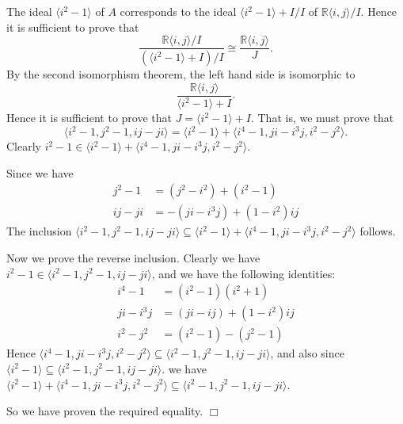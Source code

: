 \documentclass[10pt]{article}
\newenvironment{proof}[1][Proof]{\begin{trivlist}
\item[\hskip \labelsep {\bfseries #1}]}{\end{trivlist}}
\newcommand{\isom}{\cong}
\begin{document}
\begin{proof}
    The ideal $\langle i^2-1\rangle$ of $A$
    corresponds to the ideal $\langle i^2-1\rangle+I/I$
    of $\mathbb{R}\langle i,j\rangle/I$. Hence it is sufficient to prove that
    \begin{equation*}
        \frac{\mathbb{R}\langle i,j\rangle/I}{(\langle i^2-1\rangle+I)/I}\isom \frac{\mathbb{R}\langle i,j\rangle}{J}.
    \end{equation*}
    By the second isomorphism theorem, the left hand side is isomorphic to
    \begin{equation*}
        \frac{\mathbb{R}\langle i,j\rangle}{\langle i^2-1\rangle+I}.
    \end{equation*}
    Hence it is sufficient to prove that $J = \langle i^2-1\rangle+I$.
    That is, we must prove that
    \begin{equation*}
        \langle i^2-1,j^2-1,ij-ji\rangle = \langle i^2-1\rangle+\langle i^4-1,ji-i^3j,i^2-j^2\rangle.
    \end{equation*}
    Clearly $i^2-1 \in \langle i^2-1\rangle+\langle i^4-1,ji-i^3j,i^2-j^2\rangle$. 
    
    Since we have
    \begin{align*}
        j^2-1 &= (j^2-i^2)+(i^2-1)\\
        ij-ji &= -(ji - i^3j) +(1-i^2)ij
    \end{align*}    
    The inclusion $\langle i^2-1,j^2-1,ij-ji\rangle \subseteq \langle i^2-1\rangle+\langle i^4-1,ji-i^3j,i^2-j^2\rangle$
    follows.
    
    Now we prove the reverse inclusion. Clearly we have $i^2-1\in \langle i^2-1,j^2-1,ij-ji\rangle$,
    and we have the following identities:
    \begin{align*}
        i^4-1 &= (i^2-1)(i^2+1)\\
        ji-i^3j &= (ji-ij)+(1-i^2)ij\\
        i^2-j^2 &= (i^2-1)-(j^2-1)
    \end{align*}
    Hence $\langle i^4-1,ji-i^3j,i^2-j^2\rangle \subseteq \langle i^2-1,j^2-1,ij-ji\rangle$,
    and also since $\langle i^2-1\rangle \subseteq \langle i^2-1,j^2-1,ij-ji\rangle$.
    we have $\langle i^2-1\rangle+\langle i^4-1,ji-i^3j,i^2-j^2\rangle\subseteq \langle i^2-1,j^2-1,ij-ji\rangle$.
    
    So we have proven the required equality. $\Box$   
    
\end{proof} 
\end{document}
